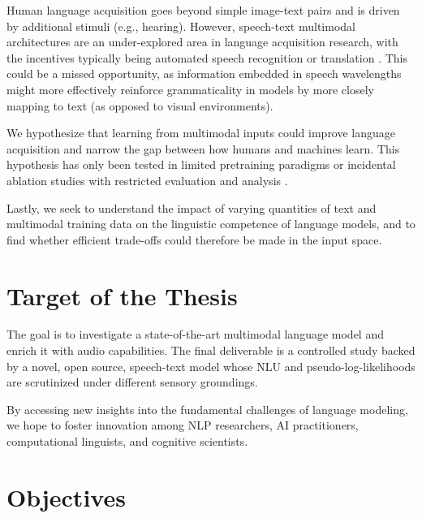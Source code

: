 \documentclass{article}
\begin{document}
Human language acquisition goes beyond simple image-text pairs and is driven by additional stimuli (e.g., hearing). However, speech-text multimodal architectures \cite{SLAM} are an under-explored area in language acquisition research, with the incentives typically being automated speech recognition or translation \cite{SpeechT5, SpeechUT, MetaASRPaper}. This could be a missed opportunity, as information embedded in speech wavelengths might more effectively reinforce grammaticality in models by more closely mapping to text (as opposed to visual environments).

We hypothesize that learning from multimodal inputs could improve language acquisition and narrow the gap between how humans and machines learn. This hypothesis has only been tested in limited pretraining paradigms \cite{BrownStudy} or incidental ablation studies with restricted evaluation and analysis \cite{FLAVA}. 

Lastly, we seek to understand the impact of varying quantities of text and multimodal training data on the linguistic competence of language models, and to find whether efficient trade-offs could therefore be made in the input space. %

\section*{Target of the Thesis}

The goal is to investigate a state-of-the-art multimodal language model and enrich it with audio capabilities. The final deliverable is a controlled study backed by a novel, open source, speech-text model whose NLU \cite{BLiMP, CoLA} and pseudo-log-likelihoods \cite{Salazar_2020} are scrutinized under different sensory groundings. 

By accessing new insights into the fundamental challenges of language modeling, we hope to foster innovation among NLP researchers, AI practitioners, computational linguists, and cognitive scientists. 


\section*{Objectives}
\end{document}
